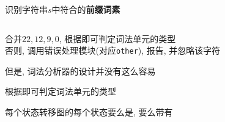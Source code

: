\begin{frame}{}
  \begin{center}
    识别字符串$s$中符合的{\bf 前缀词素}
  \end{center}

  \begin{columns}
      \begin{center}
      \end{center}
      \begin{center}
      \end{center}
  \end{columns}

  \pause
  \vspace{0.30cm}
  \begin{center}
     合并$22, 12, 9, 0$, 根据即可判定词法单元的类型 \\[8pt]
    否则, 调用错误处理模块(对应\texttt{other}), 报告, 并忽略该字符
  \end{center}
\end{frame}

\begin{frame}{}
  \begin{center}
    但是, 词法分析器的设计并没有这么容易

    \vspace{0.50cm}
  \end{center}
\end{frame}

\begin{frame}{}
  \begin{center}
    \ws \quad \ifkw \quad \elsekw \quad \id \quad \intnum \quad \relop

    \vspace{0.80cm}
    根据即可判定词法单元的类型

    \vspace{0.50cm}
    每个状态转移图的每个状态要么是, 要么带有

    \pause
    \vspace{1.20cm}
  \end{center}
\end{frame}


